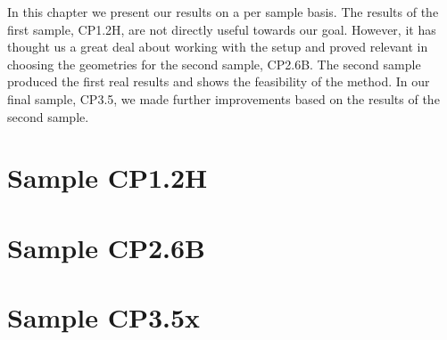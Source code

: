 In this chapter we present our results on a per sample basis. The results of the first sample, CP1.2H, are not directly useful towards our goal. However, it has thought us a great deal about working with the setup and proved relevant in choosing the geometries for the second sample, CP2.6B. The second sample produced the first real results and shows the feasibility of the method. In our final sample, CP3.5, we made further improvements based on the results of the second sample.

\section{Sample CP1.2H}


\newpage
\section{Sample CP2.6B}


\newpage
\section{Sample CP3.5x}
